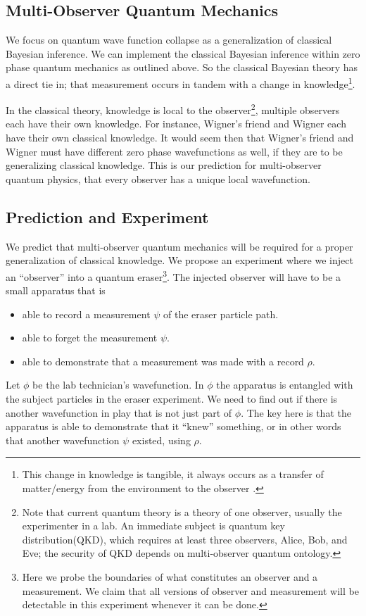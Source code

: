 \documentclass[12pt,a4paper]{article}
\theoremstyle{myrule}
\theoremstyle{postulate}
\theoremstyle{definition}
\begin{document}
\subsection{Multi-Observer Quantum Mechanics}
We focus on quantum wave function collapse as a generalization of classical Bayesian inference.  We can implement the classical Bayesian inference within zero phase quantum mechanics as outlined above.  So the classical Bayesian theory has a direct tie in; that measurement occurs in tandem with a change in knowledge\footnote{This change in knowledge is tangible, it always occurs as a transfer of matter/energy from the environment to the observer \cite{thrust}.}.  

In the classical theory, knowledge is local to the observer\footnote{Note that current quantum theory is a theory of one observer, usually the experimenter in a lab.  An immediate subject is quantum key distribution(QKD), which requires at least three observers, Alice, Bob, and Eve; the security of QKD depends on multi-observer quantum ontology.}, multiple observers each have their own knowledge.  For instance, Wigner's friend and Wigner each have their own classical knowledge.  It would seem then that Wigner's friend and Wigner must have different zero phase wavefunctions as well, if they are to be generalizing classical knowledge.  This is our prediction for multi-observer quantum physics, that every observer has a unique local wavefunction. 

\subsection{Prediction and Experiment}

We predict that multi-observer quantum mechanics will be required for a proper generalization of classical knowledge.  We propose an experiment where we inject an ``observer'' into a quantum eraser\footnote{Here we probe the boundaries of what constitutes an observer and a measurement.  We claim that all versions of observer and measurement will be detectable in this experiment whenever it can be done.}.  The injected observer will have to be a small apparatus that is
\begin{itemize}
   \item able to record a measurement $\psi$ of the eraser particle path.
   \item able to forget the measurement $\psi$.
   \item able to demonstrate that a measurement was made with a record $\rho$.
\end{itemize}
Let $\phi$ be the lab technician's wavefunction.  In $\phi$ the apparatus is entangled with the subject particles in the eraser experiment.  We need to find out if there is another wavefunction in play that is not just part of $\phi$.  The key here is that the apparatus is able to demonstrate that it ``knew'' something, or in other words that another wavefunction $\psi$ existed, using $\rho$.
\end{document}
